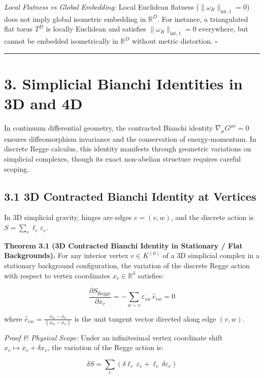 \documentclass[11pt]{article}
\begin{document}
\emph{Local Flatness vs Global Embedding:} Local Euclidean flatness ($\|\omega_R\|_{\mathrm{int}, 1} = 0$) does not imply global isometric embedding in $\mathbb{R}^D$. For instance, a triangulated flat torus $T^D$ is locally Euclidean and satisfies $\|\omega_R\|_{\mathrm{int}, 1} = 0$ everywhere, but cannot be embedded isometrically in $\mathbb{R}^D$ without metric distortion. $\square$

\medskip\hrule\medskip
\section{\texorpdfstring{3. Simplicial Bianchi Identities in 3D and 4D}{3. Simplicial Bianchi Identities in 3D and 4D}}

In continuum differential geometry, the contracted Bianchi identity $\nabla_\mu G^{\mu\nu} = 0$ ensures diffeomorphism invariance and the conservation of energy-momentum. In discrete Regge calculus, this identity manifests through geometric variations on simplicial complexes, though its exact non-abelian structure requires careful scoping.

\subsection{\texorpdfstring{3.1 3D Contracted Bianchi Identity at Vertices}{3.1 3D Contracted Bianchi Identity at Vertices}}

In 3D simplicial gravity, hinges are edges $e = (v, w)$, and the discrete action is $S = \sum_e \ell_e \varepsilon_e$.

\textbf{Theorem 3.1 (3D Contracted Bianchi Identity in Stationary / Flat Backgrounds).} For any interior vertex $v \in K^{(0)}$ of a 3D simplicial complex in a stationary background configuration, the variation of the discrete Regge action with respect to vertex coordinates $x_v \in \mathbb{R}^3$ satisfies:

\begin{equation*}
\frac{\partial S_{\mathrm{Regge}}}{\partial x_v} = -\sum_{w \sim v} \varepsilon_{vw} \, \hat{e}_{vw} = 0
\end{equation*}

where $\hat{e}_{vw} = \frac{x_w - x_v}{\|x_w - x_v\|}$ is the unit tangent vector directed along edge $(v, w)$.

\emph{Proof \& Physical Scope:} Under an infinitesimal vertex coordinate shift $x_v \mapsto x_v + \delta x_v$, the variation of the Regge action is:

\begin{equation*}
\delta S = \sum_{e} \left( \delta \ell_e \, \varepsilon_e + \ell_e \, \delta \varepsilon_e \right)
\end{equation*}
\end{document}
